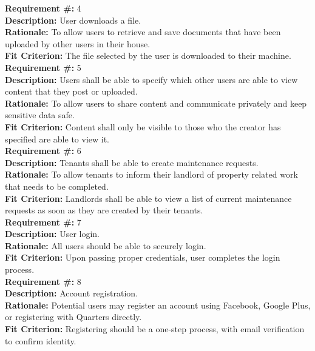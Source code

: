 \documentclass[12pt, titlepage]{article}
\begin{document}
\textbf{Requirement \#:} 4
       \\
      \textbf{Description:} User downloads a file. \\
      \textbf{Rationale:} To allow users to retrieve and save documents that 
have
      been uploaded by other users in their house. \\
      \textbf{Fit Criterion:} The file selected by the user is downloaded to
      their machine. \\

\textbf{Requirement \#:} 5
       \\
      \textbf{Description:} Users shall be able to specify which other users
      are able to view content that they post or uploaded. \\
      \textbf{Rationale:} To allow users to share content and communicate
      privately and keep sensitive data safe. \\
      \textbf{Fit Criterion:} Content shall only be visible to those who the
      creator has specified are able to view it. \\

\textbf{Requirement \#:} 6
       \\
      \textbf{Description:} Tenants shall be able to create maintenance
      requests. \\
      \textbf{Rationale:} To allow tenants to inform their landlord of property
      related work that needs to be completed. \\
      \textbf{Fit Criterion:} Landlords shall be able to view a list of current
      maintenance requests as soon as they are created by their tenants.\\
          
\textbf{Requirement \#:} 7
       \\
      \textbf{Description: }{User login.} \\
      \textbf{Rationale: }{All users should be able to securely login.} \\
      \textbf{Fit Criterion: }{Upon passing proper credentials, user completes 
the login process.} \\

\textbf{Requirement \#:} 8
       \\
      \textbf{Description: }{Account registration.} \\
      \textbf{Rationale: }{Potential users may register an account using 
Facebook, Google Plus, or registering with Quarters directly.} \\
      \textbf{Fit Criterion: }{Registering should be a one-step process, with 
email verification to confirm identity.} \\
        
\end{document}
